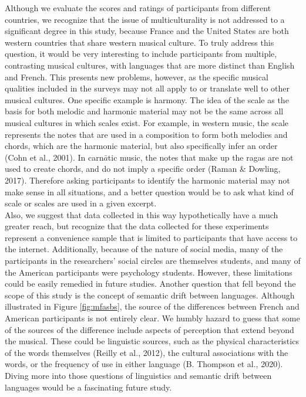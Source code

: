 \documentclass[
  english,
  man,floatsintext]{apa6}
\begin{document}
Although we evaluate the scores and ratings of participants from different countries, we recognize that the issue of multiculturality is not addressed to a significant degree in this study, because France and the United States are both western countries that share western musical culture. To truly address this question, it would be very interesting to include participants from multiple, contrasting musical cultures, with languages that are more distinct than English and French. This presents new problems, however, as the specific musical qualities included in the surveys may not all apply to or translate well to other musical cultures. One specific example is harmony. The idea of the scale as the basis for both melodic and harmonic material may not be the same across all musical cultures in which scales exist. For example, in western music, the scale represents the notes that are used in a composition to form both melodies and chords, which are the harmonic material, but also specifically infer an order (Cohn et al., 2001). In carn\(\bar{a}\)tic music, the notes that make up the ragas are not used to create chords, and do not imply a specific order (Raman \& Dowling, 2017). Therefore asking participants to identify the harmonic material may not make sense in all situations, and a better question would be to ask what kind of scale or scales are used in a given excerpt.\\
Also, we suggest that data collected in this way hypothetically have a much greater reach, but recognize that the data collected for these experiments represent a convenience sample that is limited to participants that have access to the internet. Additionally, because of the nature of social media, many of the participants in the researchers' social circles are themselves students, and many of the American participants were psychology students. However, these limitations could be easily remedied in future studies.
Another question that fell beyond the scope of this study is the concept of semantic drift between languages. Although illustrated in Figure \ref{fig:mfasbs}, the source of the differences between French and American participants is not entirely clear. We humbly hazard to guess that some of the sources of the difference include aspects of perception that extend beyond the musical. These could be linguistic sources, such as the physical characteristics of the words themselves (Reilly et al., 2012), the cultural associations with the words, or the frequency of use in either language (B. Thompson et al., 2020). Diving more into those questions of linguistics and semantic drift between languages would be a fascinating future study.
\end{document}
